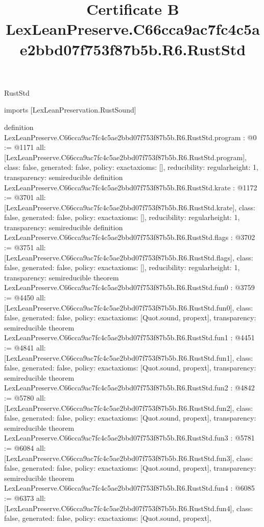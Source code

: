 \begin{lexlean}{RustStd}
\title{Certificate B LexLeanPreserve.C66cca9ac7fc4c5ae2bbd07f753f87b5b.R6.RustStd}
\begin{coremodule}
imports [LexLeanPreservation.RustSound]

definition LexLeanPreserve.C66cca9ac7fc4c5ae2bbd07f753f87b5b.R6.RustStd.program : @0 := @1171 {
  all: [LexLeanPreserve.C66cca9ac7fc4c5ae2bbd07f753f87b5b.R6.RustStd.program],
  class: false,
  generated: false,
  policy: exact{axioms: []},
  reducibility: regular{height: 1},
  transparency: semireducible
}
definition LexLeanPreserve.C66cca9ac7fc4c5ae2bbd07f753f87b5b.R6.RustStd.krate : @1172 := @3701 {
  all: [LexLeanPreserve.C66cca9ac7fc4c5ae2bbd07f753f87b5b.R6.RustStd.krate],
  class: false,
  generated: false,
  policy: exact{axioms: []},
  reducibility: regular{height: 1},
  transparency: semireducible
}
definition LexLeanPreserve.C66cca9ac7fc4c5ae2bbd07f753f87b5b.R6.RustStd.flags : @3702 := @3751 {
  all: [LexLeanPreserve.C66cca9ac7fc4c5ae2bbd07f753f87b5b.R6.RustStd.flags],
  class: false,
  generated: false,
  policy: exact{axioms: []},
  reducibility: regular{height: 1},
  transparency: semireducible
}
theorem LexLeanPreserve.C66cca9ac7fc4c5ae2bbd07f753f87b5b.R6.RustStd.fun0 : @3759 := @4450 {
  all: [LexLeanPreserve.C66cca9ac7fc4c5ae2bbd07f753f87b5b.R6.RustStd.fun0],
  class: false,
  generated: false,
  policy: exact{axioms: [Quot.sound, propext]},
  transparency: semireducible
}
theorem LexLeanPreserve.C66cca9ac7fc4c5ae2bbd07f753f87b5b.R6.RustStd.fun1 : @4451 := @4841 {
  all: [LexLeanPreserve.C66cca9ac7fc4c5ae2bbd07f753f87b5b.R6.RustStd.fun1],
  class: false,
  generated: false,
  policy: exact{axioms: [Quot.sound, propext]},
  transparency: semireducible
}
theorem LexLeanPreserve.C66cca9ac7fc4c5ae2bbd07f753f87b5b.R6.RustStd.fun2 : @4842 := @5780 {
  all: [LexLeanPreserve.C66cca9ac7fc4c5ae2bbd07f753f87b5b.R6.RustStd.fun2],
  class: false,
  generated: false,
  policy: exact{axioms: [Quot.sound, propext]},
  transparency: semireducible
}
theorem LexLeanPreserve.C66cca9ac7fc4c5ae2bbd07f753f87b5b.R6.RustStd.fun3 : @5781 := @6084 {
  all: [LexLeanPreserve.C66cca9ac7fc4c5ae2bbd07f753f87b5b.R6.RustStd.fun3],
  class: false,
  generated: false,
  policy: exact{axioms: [Quot.sound, propext]},
  transparency: semireducible
}
theorem LexLeanPreserve.C66cca9ac7fc4c5ae2bbd07f753f87b5b.R6.RustStd.fun4 : @6085 := @6373 {
  all: [LexLeanPreserve.C66cca9ac7fc4c5ae2bbd07f753f87b5b.R6.RustStd.fun4],
  class: false,
  generated: false,
  policy: exact{axioms: [Quot.sound, propext]},
}
\end{coremodule}
\end{lexlean}
